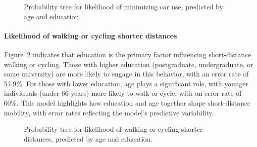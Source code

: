 \documentclass[
  letterpaper,
  DIV=11,
  numbers=noendperiod]{scrartcl}
\let\oldparagraph\paragraph
\renewcommand{\paragraph}[1]{\oldparagraph{#1}\mbox{}}
\begin{document}
\begin{figure}


\caption{\label{fig-eleven}Probability tree for likelihood of minimizing
car use, predicted by age and education.}

\end{figure}%

\paragraph{Likelihood of walking or cycling shorter
distances}\label{likelihood-of-walking-or-cycling-shorter-distances}

Figure~\ref{fig-twelve} indicates that education is the primary factor
influencing short-distance walking or cycling. Those with higher
education (postgraduate, undergraduate, or some university) are more
likely to engage in this behavior, with an error rate of 51.9\%. For
those with lower education, age plays a significant role, with younger
individuals (under 66 years) more likely to walk or cycle, with an error
rate of 60\%. This model highlights how education and age together shape
short-distance mobility, with error rates reflecting the model's
predictive variability.

\begin{figure}


\caption{\label{fig-twelve}Probability tree for likelihood of walking or
cycling shorter distances, predicted by age and education.}

\end{figure}%
\end{document}
